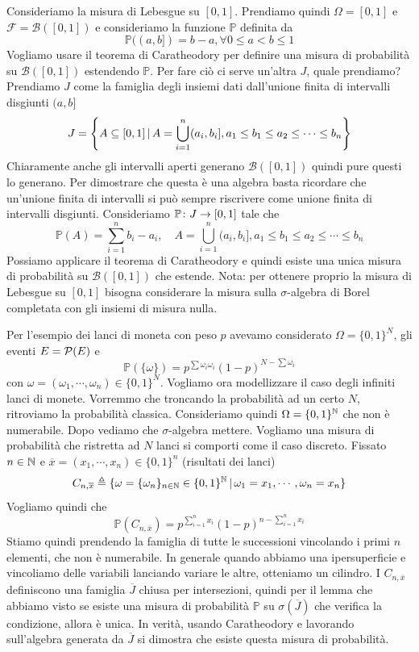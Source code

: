 \documentclass[a4paper]{article}
\begin{document}
Consideriamo la misura di Lebesgue su \([0,1]\).
Prendiamo quindi \(\Omega = [0,1]\)
e \(\mathcal F = \mathcal B([0,1])\)
e consideriamo la funzione \(\mathbb P\)
definita da
\[
    \mathbb P((a, b]) = b-a, \forall 0 \leq a < b \leq 1
\]
Vogliamo usare il teorema di Caratheodory
per definire una misura di probabilità su
\(\mathcal B([0,1])\) estendendo \(\mathbb P\).
Per fare ciò ci serve un'altra \(J\), quale prendiamo?
Prendiamo \(J\) come la famiglia degli insiemi dati dall'unione finita
di intervalli disgiunti \((a,b]\)
\[
    J = \left\{
        A \subseteq [0,1] \,|\, A = \bigcup_{i=1}^n (a_i, b_i],
        a_1 \leq b_1 \leq a_2 \leq \cdots \leq b_n
    \right\}
\]
Chiaramente anche gli intervalli aperti generano \(\mathcal B([0,1])\)
quindi pure questi lo generano.
Per dimostrare che questa è una algebra basta ricordare che
un'unione finita di intervalli
si può sempre riscrivere come unione finita
di intervalli disgiunti.
Consideriamo \(\mathbb P \colon J \to [0,1]\)
tale che \[
    \mathbb P(A) = \sum_{i=1}^n b_i - a_i, \quad A = \bigcup_{i=1}^n (a_i, b_i],
    a_1 \leq b_1 \leq a_2 \leq \cdots \leq b_n
\]
Possiamo applicare il teorema di Caratheodory e quindi esiste una unica misura di probabilità
su \(\mathcal B([0,1])\)
che estende.
Nota: per ottenere proprio la misura di Lebesgue su \([0,1]\)
bisogna considerare la misura sulla \(\sigma\)-algebra
di Borel completata con gli insiemi di misura nulla.

Per l'esempio dei lanci di moneta con peso \(p\) avevamo considerato \(\Omega = \{0,1\}^N\),
gli eventi \(E = \mathcal P(E)\) e \[
    \mathbb P(\{\omega\})
    = p^{\sum \omega_i \omega_i}
    (1-p)^{N - \sum \omega_i}
\]
con \(\omega = (\omega_1, \cdots, \omega_n) \in \{0,1\}^N\).
Vogliamo ora modellizzare il caso degli infiniti lanci di monete.
Vorremmo che troncando la probabilità ad un certo \(N\), ritroviamo la probabilità classica.
Consideriamo quindi \(\Omega = \{0,1\}^{\mathbb{N}}\)
che non è numerabile. Dopo vediamo che \(\sigma\)-algebra
mettere. Vogliamo una misura di probabilità che ristretta ad \(N\)
lanci si comporti come il caso discreto.
Fissato \(n \in \mathbb{N}\) e \(\overline x = (x_1, \cdots, x_n) \in \{0,1\}^n\)
(risultati dei lanci) \[
    C_{n, \overline x} \triangleq \{
        \omega = \{\omega_n\}_{n \in \mathbb{N}} \in \{0,1\}^{\mathbb{N}}
        \,|\, \omega_1 = x_1, \cdots, \omega_n = x_n
    \}
\]
Vogliamo quindi che \[
    \mathbb P\left(
        C_{n, \overline x}
    \right)
    = p^{\sum_{i=1}^n x_i}
    (1-p)^{n - \sum_{i=1}^n x_i}
\]
Stiamo quindi prendendo la famiglia di tutte le successioni vincolando i primi \(n\) elementi,
che non è numerabile. In generale quando abbiamo una ipersuperficie
e vincoliamo delle variabili lanciando variare le altre, otteniamo un cilindro.
I \(C_{n, \overline x}\) definiscono una famiglia \(\overline J\)
chiusa per intersezioni, quindi per il lemma che abbiamo visto se esiste una misura di probabilità
\(\mathbb P\) su \(\sigma(\overline J)\) che verifica la condizione, allora è unica.
In verità, usando Caratheodory e lavorando sull'algebra generata da
\(\overline J\) si dimostra che esiste questa misura di probabilità.
\end{document}
